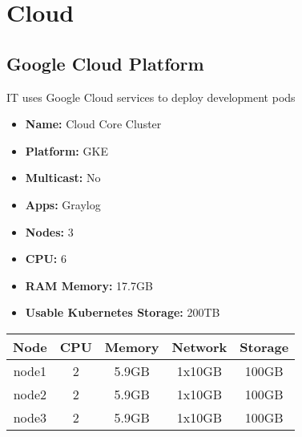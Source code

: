 \newpage
\section{Cloud}
\subsection{Google Cloud Platform}
IT uses Google Cloud services to deploy development pods
\begin{itemize}
  \itemsep0em 
  \item \textbf{Name:}       Cloud Core Cluster
  \item \textbf{Platform:}   GKE
  \item \textbf{Multicast:}  No
  \item \textbf{Apps:}       Graylog
  \item \textbf{Nodes:}      3
  \item \textbf{CPU:}        6
  \item \textbf{RAM Memory:} 17.7GB
  \item \textbf{Usable Kubernetes Storage:} 200TB
\end{itemize}
\begin{center}
  \small
  \begin{tabular}{||c c c c c||}
    \hline
    \textbf{Node} & \textbf{CPU} & \textbf{Memory} & \textbf{Network} & \textbf{Storage} \\ [0.5ex]
    \hline
    node1 & 2 & 5.9GB & 1x10GB & 100GB \\
    \hline
    node2 & 2 & 5.9GB & 1x10GB & 100GB \\
    \hline
    node3 & 2 & 5.9GB & 1x10GB & 100GB \\
    \hline
  \end{tabular}
\end{center}